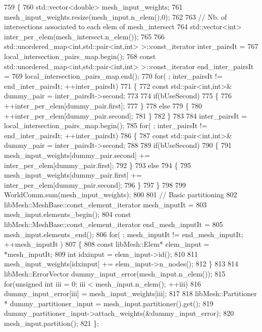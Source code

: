 \begin{DoxyCode}
759 \{
760     std::vector<double> mesh\_input\_weights;
761     mesh\_input\_weights.resize(mesh\_input.n\_elem(),0);
762 
763     \textcolor{comment}{// Nb. of intersections associated to each elem of mesh\_intersect}
764     std::vector<int>    inter\_per\_elem(mesh\_intersect.n\_elem());
765 
766     std::unordered\_map<int,std::pair<int,int> >::const\_iterator inter\_pairsIt =
767             local\_intersection\_pairs\_map.begin();
768     \textcolor{keyword}{const} std::unordered\_map<int,std::pair<int,int> >::const\_iterator end\_inter\_pairsIt =
769             local\_intersection\_pairs\_map.end();
770     \textcolor{keywordflow}{for}( ; inter\_pairsIt != end\_inter\_pairsIt; ++inter\_pairsIt)
771     \{
772         \textcolor{keyword}{const} std::pair<int,int>& dummy\_pair = inter\_pairsIt->second;
773 
774         \textcolor{keywordflow}{if}(bUseSecond)
775         \{
776             ++inter\_per\_elem[dummy\_pair.first];
777         \}
778         \textcolor{keywordflow}{else}
779         \{
780             ++inter\_per\_elem[dummy\_pair.second];
781         \}
782     \}
783 
784     inter\_pairsIt = local\_intersection\_pairs\_map.begin();
785     \textcolor{keywordflow}{for}( ; inter\_pairsIt != end\_inter\_pairsIt; ++inter\_pairsIt)
786     \{
787         \textcolor{keyword}{const} std::pair<int,int>& dummy\_pair = inter\_pairsIt->second;
788 
789         \textcolor{keywordflow}{if}(bUseSecond)
790         \{
791             mesh\_input\_weights[dummy\_pair.second] += inter\_per\_elem[dummy\_pair.first];
792         \}
793         \textcolor{keywordflow}{else}
794         \{
795             mesh\_input\_weights[dummy\_pair.first] += inter\_per\_elem[dummy\_pair.second];
796         \}
797     \}
798 
799     WorldComm.sum(mesh\_input\_weights);
800 
801     \textcolor{comment}{// Basic partitioning}
802     libMesh::MeshBase::const\_element\_iterator           mesh\_inputIt =
803             mesh\_input.elements\_begin();
804     \textcolor{keyword}{const} libMesh::MeshBase::const\_element\_iterator     end\_mesh\_inputIt =
805             mesh\_input.elements\_end();
806     \textcolor{keywordflow}{for}( ; mesh\_inputIt != end\_mesh\_inputIt; ++mesh\_inputIt )
807     \{
808         \textcolor{keyword}{const} libMesh::Elem* elem\_input = *mesh\_inputIt;
809         \textcolor{keywordtype}{int} idxinput = elem\_input->id();
810 
811         mesh\_input\_weights[idxinput] += elem\_input->n\_nodes();
812     \}
813 
814     libMesh::ErrorVector dummy\_input\_error(mesh\_input.n\_elem());
815     \textcolor{keywordflow}{for}(\textcolor{keywordtype}{unsigned} \textcolor{keywordtype}{int} iii = 0; iii < mesh\_input.n\_elem(); ++iii)
816         dummy\_input\_error[iii] = mesh\_input\_weights[iii];
817 
818     libMesh::Partitioner * dummy\_partitioner\_input = mesh\_input.partitioner().get();
819     dummy\_partitioner\_input->attach\_weights(&dummy\_input\_error);
820     mesh\_input.partition();
821 \};
\end{DoxyCode}
\hypertarget{namespacecarl_a995bb6a3c01d8cede8268c2f39ce0768}{}
